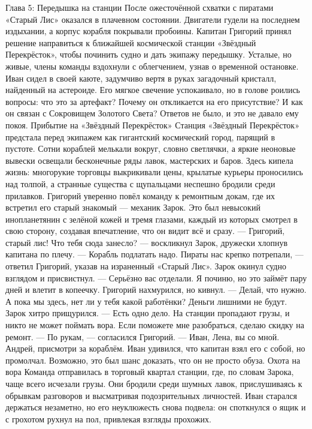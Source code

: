 \documentclass[12pt,a4paper]{book}
\begin{document}
Глава 5: Передышка на станции
После ожесточённой схватки с пиратами «Старый Лис» оказался в плачевном состоянии. Двигатели гудели на последнем издыхании, а корпус корабля покрывали пробоины. Капитан Григорий принял решение направиться к ближайшей космической станции «Звёздный Перекрёсток», чтобы починить судно и дать экипажу передышку. Усталые, но живые, члены команды вздохнули с облегчением, узнав о временной остановке.
Иван сидел в своей каюте, задумчиво вертя в руках загадочный кристалл, найденный на астероиде. Его мягкое свечение успокаивало, но в голове роились вопросы: что это за артефакт? Почему он откликается на его присутствие? И как он связан с Сокровищем Золотого Света? Ответов не было, и это не давало ему покоя.
Прибытие на «Звёздный Перекрёсток»
Станция «Звёздный Перекрёсток» предстала перед экипажем как гигантский космический город, парящий в пустоте. Сотни кораблей мелькали вокруг, словно светлячки, а яркие неоновые вывески освещали бесконечные ряды лавок, мастерских и баров. Здесь кипела жизнь: многорукие торговцы выкрикивали цены, крылатые курьеры проносились над толпой, а странные существа с щупальцами неспешно бродили среди прилавков.
Григорий уверенно повёл команду к ремонтным докам, где их встретил его старый знакомый — механик Зарок. Это был невысокий инопланетянин с зелёной кожей и тремя глазами, каждый из которых смотрел в свою сторону, создавая впечатление, что он видит всё и сразу.
— Григорий, старый лис! Что тебя сюда занесло? — воскликнул Зарок, дружески хлопнув капитана по плечу.
— Корабль подлатать надо. Пираты нас крепко потрепали, — ответил Григорий, указав на израненный «Старый Лис».
Зарок окинул судно взглядом и присвистнул.
— Серьёзно вас отделали. Я починю, но это займёт пару дней и влетит в копеечку.
Григорий нахмурился, но кивнул.
— Делай, что нужно. А пока мы здесь, нет ли у тебя какой работёнки? Деньги лишними не будут.
Зарок хитро прищурился.
— Есть одно дело. На станции пропадают грузы, и никто не может поймать вора. Если поможете мне разобраться, сделаю скидку на ремонт.
— По рукам, — согласился Григорий. — Иван, Лена, вы со мной. Андрей, присмотри за кораблём.
Иван удивился, что капитан взял его с собой, но промолчал. Возможно, это был шанс доказать, что он не просто обуза.
Охота на вора
Команда отправилась в торговый квартал станции, где, по словам Зарока, чаще всего исчезали грузы. Они бродили среди шумных лавок, прислушиваясь к обрывкам разговоров и высматривая подозрительных личностей. Иван старался держаться незаметно, но его неуклюжесть снова подвела: он споткнулся о ящик и с грохотом рухнул на пол, привлекая взгляды прохожих.
\end{document}
